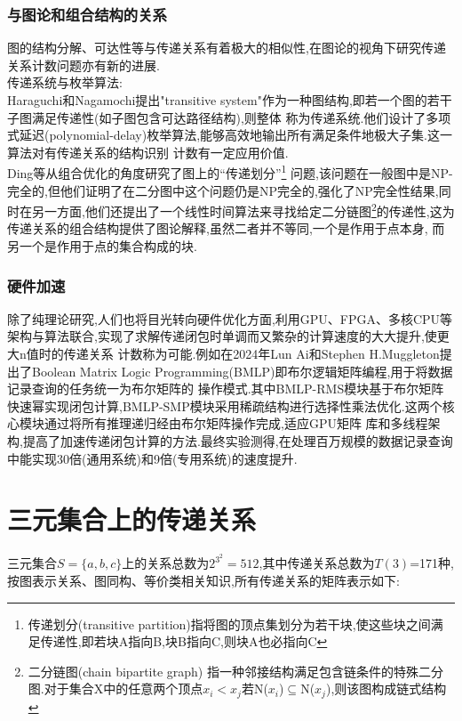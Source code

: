 \documentclass[12pt]{article}
\theoremstyle{definition}
\begin{document}
\subsubsection{与图论和组合结构的关系}
图的结构分解、可达性等与传递关系有着极大的相似性,在图论的视角下研究传递关系计数问题亦有新的进展.\\
传递系统与枚举算法:\\
\hspace*{2em}Haraguchi和Nagamochi提出"transitive system"作为一种图结构,即若一个图的若干子图满足传递性(如子图包含可达路径结构),则整体
称为传递系统.他们设计了多项式延迟(polynomial-delay)枚举算法,能够高效地输出所有满足条件地极大子集.这一算法对有传递关系的结构识别
计数有一定应用价值.\cite{haraguchi2020polynomial}\\
\hspace*{2em}Ding等从组合优化的角度研究了图上的“传递划分”\footnote{传递划分(transitive partition)指将图的顶点集划分为若干块,使这些块之间满足传递性,即若块A指向B,块B指向C,则块A也必指向C}
问题,该问题在一般图中是NP-完全的,但他们证明了在二分图中这个问题仍是NP完全的,强化了NP完全性结果,同时在另一方面,他们还提出了一个线性时间算法来寻找给定二分链图\footnote{二分链图(chain bipartite graph)
指一种邻接结构满足包含链条件的特殊二分图.对于集合X中的任意两个顶点$x_i<x_j$若N($x_i$)$\subseteq  $N($x_j$),则该图构成链式结构}的传递性,这为传递关系的组合结构提供了图论解释,虽然二者并不等同,一个是作用于点本身,
而另一个是作用于点的集合构成的块.\cite{ding2022transitivity}
\subsubsection{硬件加速}
除了纯理论研究,人们也将目光转向硬件优化方面,利用GPU、FPGA、多核CPU等架构与算法联合,实现了求解传递闭包时单调而又繁杂的计算速度的大大提升,使更大n值时的传递关系
计数称为可能.例如在2024年Lun Ai和Stephen H.Muggleton提出了Boolean Matrix Logic Programming(BMLP)即布尔逻辑矩阵编程,用于将数据记录查询的任务统一为布尔矩阵的
操作模式.其中BMLP-RMS模块基于布尔矩阵快速幂实现闭包计算,BMLP-SMP模块采用稀疏结构进行选择性乘法优化.这两个核心模块通过将所有推理递归经由布尔矩阵操作完成,适应GPU矩阵
库和多线程架构,提高了加速传递闭包计算的方法.最终实验测得,在处理百万规模的数据记录查询中能实现30倍(通用系统)和9倍(专用系统)的速度提升.\cite{ai2024boolean}

\newpage
\section{三元集合上的传递关系}
三元集合$S=\{a,b,c\}$上的关系总数为$2^{3^2}=512$,其中传递关系总数为$T(3)$=171种,按图表示关系、图同构、等价类相关知识,所有传递关系的矩阵表示如下:\\
\end{document}
